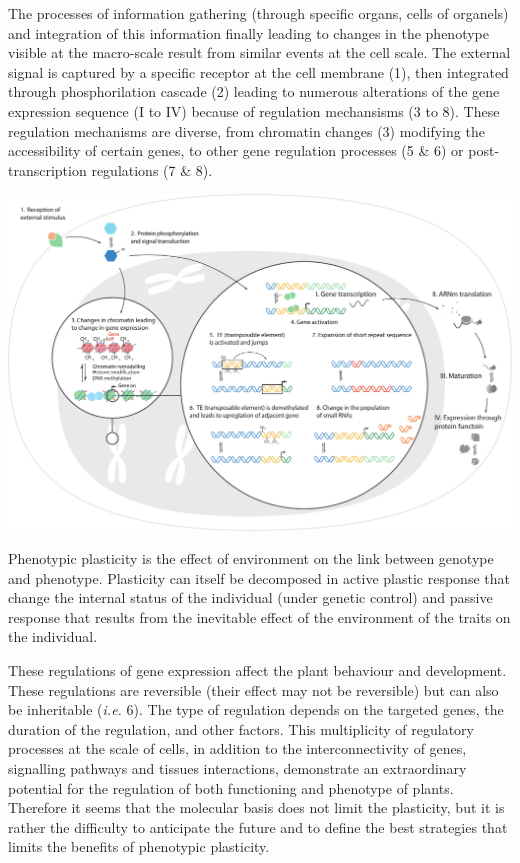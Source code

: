 {\begin{fullwidth}
\begin{tcolorbox}[title=Molecular basis of phenotypic plasticity]
The processes of information gathering (through specific organs, cells of organels) and integration of this information finally leading to changes in the phenotype visible at the macro-scale result from similar events at the cell scale. The external signal is captured by a specific receptor at the cell membrane (1), then integrated through phosphorilation cascade (2) leading to numerous alterations of the gene expression sequence (I to IV) because of regulation mechansisms (3 to 8). These regulation mechanisms are diverse, from chromatin changes (3) modifying the accessibility of certain genes, to other gene regulation processes (5 \& 6) or post-transcription regulations (7 \& 8).



    \includegraphics[width=1\linewidth]{./1_Introduction/graphics/molecular_basis.pdf}
  
{\footnotesize     Phenotypic plasticity is the effect of environment on the link between genotype and phenotype. Plasticity can itself be decomposed in active plastic response that change the internal status of the individual (under genetic control) and passive response that results from the inevitable effect of the environment of the traits on the individual.}
   
   \label{fig:plasticity_form}

These regulations of gene expression affect the plant behaviour and development. These regulations are reversible (their effect may not be reversible) but can also be inheritable (\textit{i.e.} 6). The type of regulation depends on the targeted genes, the duration of the regulation, and other factors. This multiplicity of regulatory processes at the scale of cells, in addition to the interconnectivity of genes, signalling pathways and tissues interactions, demonstrate an extraordinary potential for the regulation of both functioning and phenotype of plants. Therefore it seems that the molecular basis does not limit the plasticity, but it is rather the difficulty to anticipate the future and to define the best strategies that limits the benefits of phenotypic plasticity.


\end{tcolorbox}
\end{fullwidth}}
